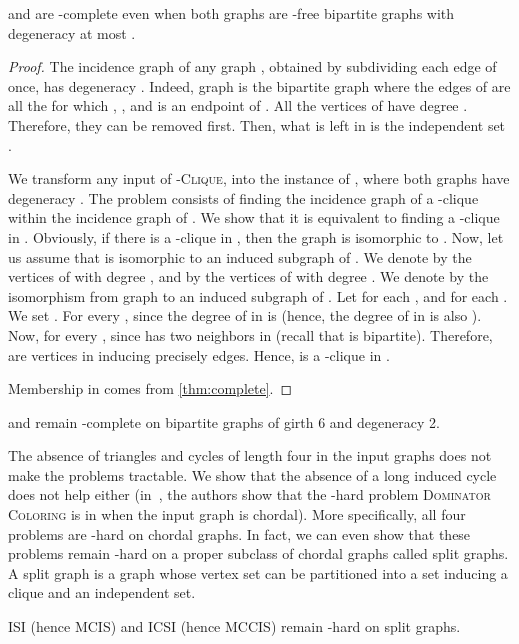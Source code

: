 \begin{theorem}
\isi and \icsi are -complete even when both graphs are -free 
bipartite graphs with degeneracy at most .
\end{theorem}
\begin{proof}
The incidence graph  of any graph , obtained by subdividing each edge of  once, has degeneracy . 
Indeed, graph  is the bipartite graph  where the edges of  are all the  for which , , and  is an endpoint of . 
All the vertices  of  have degree .
Therefore, they can be removed first. 
Then, what is left in  is the independent set .

We transform any input  of \textsc{-Clique}, into the instance  of \ISIC, where both graphs have degeneracy .
The problem consists of finding the incidence graph of a -clique within the incidence graph of . 
We show that it is equivalent to finding a -clique in .
Obviously, if there is a -clique  in , then the graph  is isomorphic to .
Now, let us assume that  is isomorphic to an induced subgraph of .
We denote by  the vertices of  with degree , and by  the vertices of  with degree .
We denote by  the isomorphism from graph  to an induced subgraph of .
Let  for each , and  for each .
We set .
For every ,  since the degree of  in  is  (hence, the degree of  in  is also ).
Now, for every ,  since  has two neighbors in  (recall that  is bipartite).
Therefore,  are  vertices in  inducing precisely  edges.
Hence,  is a -clique in .

Membership in  comes from \autoref{thm:complete}. 
\end{proof}

\begin{corollary}
\mcis and \mccis remain -complete on bipartite graphs of girth 6 and 
degeneracy 2.
\end{corollary}

The absence of triangles and cycles of length four in the input graphs does not make the problems tractable.
We show that the absence of a long induced cycle does not help either (in~\cite{Arumugam11}, the authors show that the -hard problem \textsc{Dominator Coloring} is in  when the input graph is chordal).
More specifically, all four problems are -hard on chordal graphs.
In fact, we can even show that these problems remain -hard on a proper subclass of chordal graphs called split graphs.
A split graph is a graph whose vertex set can be partitioned into a set inducing a clique and an independent set.

\begin{theorem}
ISI (hence MCIS) and ICSI (hence MCCIS) remain -hard on split graphs.
\end{theorem}

